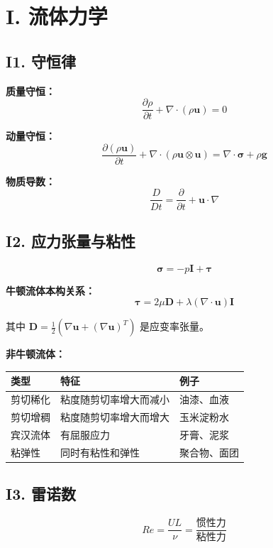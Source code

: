 \section{I. 流体力学}
\label{sec:fluid}

\subsection{I1. 守恒律}

\textbf{质量守恒：}
\[
\frac{\partial \rho}{\partial t} + \nabla \cdot (\rho \mathbf{u}) = 0
\]

\textbf{动量守恒：}
\[
\frac{\partial(\rho \mathbf{u})}{\partial t} + \nabla \cdot (\rho \mathbf{u} \otimes \mathbf{u}) = \nabla \cdot \boldsymbol{\sigma} + \rho \mathbf{g}
\]

\textbf{物质导数：}
\[
\frac{D}{Dt} = \frac{\partial}{\partial t} + \mathbf{u} \cdot \nabla
\]

\subsection{I2. 应力张量与粘性}

\[
\boldsymbol{\sigma} = -p\mathbf{I} + \boldsymbol{\tau}
\]

\textbf{牛顿流体本构关系：}
\[
\boldsymbol{\tau} = 2\mu\mathbf{D} + \lambda(\nabla\cdot\mathbf{u})\mathbf{I}
\]

其中 $\mathbf{D} = \frac{1}{2}(\nabla\mathbf{u} + (\nabla\mathbf{u})^T)$ 是应变率张量。

\textbf{非牛顿流体：}
\begin{center}
\begin{tabular}{lll}
\toprule
\textbf{类型} & \textbf{特征} & \textbf{例子} \\
\midrule
剪切稀化 & 粘度随剪切率增大而减小 & 油漆、血液 \\
剪切增稠 & 粘度随剪切率增大而增大 & 玉米淀粉水 \\
宾汉流体 & 有屈服应力 & 牙膏、泥浆 \\
粘弹性 & 同时有粘性和弹性 & 聚合物、面团 \\
\bottomrule
\end{tabular}
\end{center}

\subsection{I3. 雷诺数}

\[
Re = \frac{UL}{\nu} = \frac{\text{惯性力}}{\text{粘性力}}
\]

